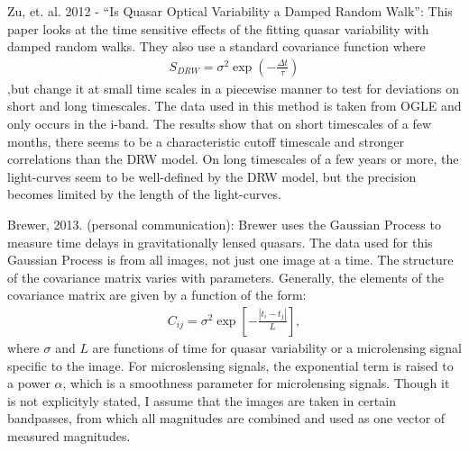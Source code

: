\documentclass[letterpaper,12pt,preprint]{aastex}
\begin{document}
Zu, et. al. 2012 - ``Is Quasar Optical Variability a Damped Random
Walk'': This paper looks at the time sensitive effects of the fitting
quasar variability with damped random walks. They also use a standard
covariance function where
\begin{eqnarray}
S_{DRW}=\sigma^2\exp\left(-\frac{\Delta t}{\tau}\right)
\end{eqnarray}
,but change it at small time scales in a piecewise
manner to test for deviations on short and long timescales. The data
used in this method is taken from OGLE and only occurs in the i-band.
The results show that on short timescales of a few months, there seems
to be a characteristic cutoff timescale and stronger correlations than
the DRW model. On long timescales of a few years or more, the
light-curves seem to be well-defined by the DRW model, but the
precision becomes limited by the length of the light-curves.

Brewer, 2013. (personal communication): Brewer uses the Gaussian
Process to measure time delays in gravitationally lensed quasars. The
data used for this Gaussian Process is from all images, not just one
image at a time. The structure of the covariance matrix varies with
parameters. Generally, the elements of the covariance matrix are given
by a function of the form:
\begin{eqnarray}
C_{ij}=\sigma^2 \exp\left[-\frac{|t_i-t_j|}{L}\right],
\end{eqnarray}
where $\sigma$ and $L$ are functions of time for quasar variability or
a microlensing signal specific to the image. For microslensing
signals, the exponential term is raised to a power $\alpha$, which is
a smoothness parameter for microlensing signals. Though it is not
explicityly stated, I assume that the images are taken in certain
bandpasses, from which all magnitudes are combined and used as one
vector of measured magnitudes.
\end{document}
